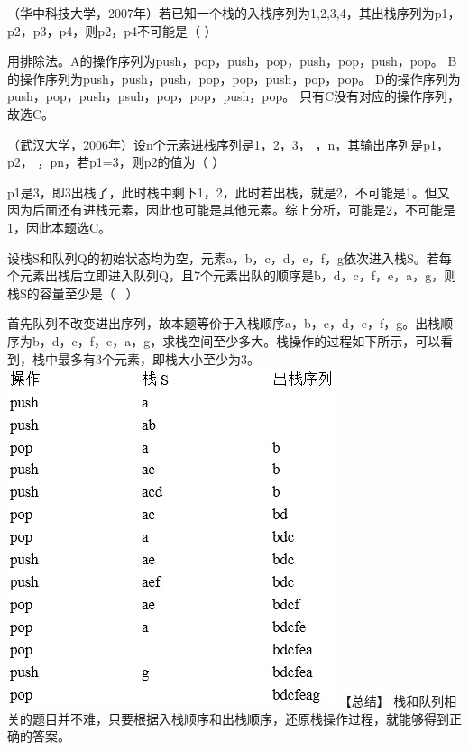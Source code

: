 \question （华中科技大学，2007年）若已知一个栈的入栈序列为1,2,3,4，其出栈序列为p1，p2，p3，p4，则p2，p4不可能是（
）
\par{}
\begin{solution}用排除法。A的操作序列为push，pop，push，pop，push，pop，push，pop。
B的操作序列为push，push，push，pop，pop，push，pop，pop。
D的操作序列为push，pop，push，psuh，pop，pop，push，pop。
只有C没有对应的操作序列，故选C。
\end{solution}
\question （武汉大学，2006年）设n个元素进栈序列是1，2，3，
，n，其输出序列是p1，p2， ，pn，若p1=3，则p2的值为（ ）
\par{}
\begin{solution}p1是3，即3出栈了，此时栈中剩下1，2，此时若出栈，就是2，不可能是1。但又因为后面还有进栈元素，因此也可能是其他元素。综上分析，可能是2，不可能是1，因此本题选C。
\end{solution}
\question 设栈S和队列Q的初始状态均为空，元素a，b，c，d，e，f，g依次进入栈S。若每个元素出栈后立即进入队列Q，且7个元素出队的顺序是b，d，c，f，e，a，g，则栈S的容量至少是（
~）
\par{}
\begin{solution}首先队列不改变进出序列，故本题等价于入栈顺序a，b，c，d，e，f，g。出栈顺序为b，d，c，f，e，a，g，求栈空间至少多大。栈操作的过程如下所示，可以看到，栈中最多有3个元素，即栈大小至少为3。
\includegraphics[width=3.78125in,height=3.90625in]{computerassets/13bba34f34f8765d413e9d53bfddf745.jpeg}
【总结】
栈和队列相关的题目并不难，只要根据入栈顺序和出栈顺序，还原栈操作过程，就能够得到正确的答案。
\end{solution}
